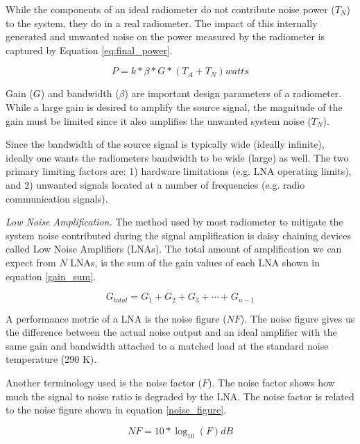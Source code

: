 
While the components of an ideal radiometer do not contribute noise power ($T_N$) to the system, they do in a real radiometer.  The impact of this internally generated and unwanted noise on the power measured by the radiometer is captured by Equation \ref{eq:final_power}.

\begin{equation} \label{eq:final_power}
P=k*\beta*G*(T_{A}+T_{N}) watts
\end{equation}

Gain ($G$) and bandwidth ($\beta$) are important design parameters of a radiometer.  While a large gain is desired to amplify the source signal, the magnitude of the gain must be limited since it also amplifies the unwanted system noise ($T_N$).

Since the bandwidth of the source signal is typically wide (ideally infinite), ideally one wants the radiometers bandwidth to be wide (large) as well.  The two primary limiting factors are: 1) hardware limitations (e.g. LNA operating limits), and 2) unwanted signals located at a number of frequencies (e.g. radio communication signals).

\emph{Low Noise Amplification.}  The method used by most radiometer to mitigate the system noise contributed during the signal amplification is daisy chaining devices called Low Noise Amplifiers (LNAs).  The total amount of amplification we can expect from $N$ LNAs, is the sum of the gain values of each LNA shown in equation \ref{gain_sum}.

\begin{equation}\label{gain_sum}
G_{total}=G_1 + G_2 + G_3 + \cdots +G_{n-1}
\end{equation}

A performance metric of a LNA is the noise figure ($NF$).  The noise figure gives us the difference between the actual noise output and an ideal amplifier with the same gain and bandwidth attached to a matched load at the standard noise temperature (290 K).

Another terminology used is the noise factor ($F$).  The noise factor shows how much the signal to noise ratio is degraded by the LNA.  The noise factor is related to the noise figure shown in equation \ref{noise_figure}.

\begin{equation}\label{noise_figure}
NF=10 * \log_{10}(F) dB
\end{equation}

